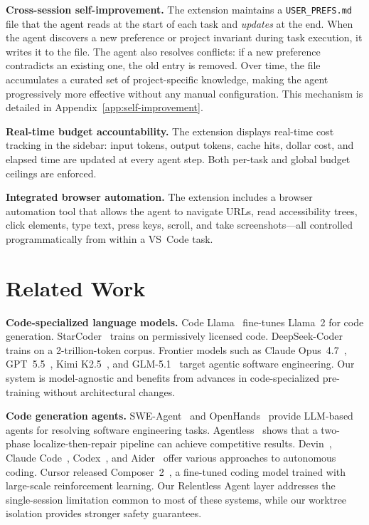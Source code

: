 \documentclass{article}
\begin{document}
\textbf{Cross-session self-improvement.}  The extension maintains a \texttt{USER\_PREFS.md} file that the agent reads at the start of each task and \emph{updates} at the end.  When the agent discovers a new preference or project invariant during task execution, it writes it to the file.  The agent also resolves conflicts: if a new preference contradicts an existing one, the old entry is removed.  Over time, the file accumulates a curated set of project-specific knowledge, making the agent progressively more effective without any manual configuration.  This mechanism is detailed in Appendix~\ref{app:self-improvement}.

\textbf{Real-time budget accountability.}  The extension displays real-time cost tracking in the sidebar: input tokens, output tokens, cache hits, dollar cost, and elapsed time are updated at every agent step.  Both per-task and global budget ceilings are enforced.

\textbf{Integrated browser automation.}  The extension includes a browser automation tool that allows the agent to navigate URLs, read accessibility trees, click elements, type text, press keys, scroll, and take screenshots---all controlled programmatically from within a VS~Code task.

\section{Related Work}
\label{sec:related}

\textbf{Code-specialized language models.}  Code Llama~\citep{roziere2023code} fine-tunes Llama~2 for code generation.  StarCoder~\citep{li2023starcoder} trains on permissively licensed code.  DeepSeek-Coder~\citep{guo2024deepseek} trains on a 2-trillion-token corpus.  Frontier models such as Claude Opus~4.7~\citep{anthropic2026opus47}, GPT~5.5~\citep{openai2026gpt55}, Kimi K2.5~\citep{kimiteam2026k25}, and GLM-5.1~\citep{zai2026glm51} target agentic software engineering.  Our system is model-agnostic and benefits from advances in code-specialized pre-training without architectural changes.

\textbf{Code generation agents.}  SWE-Agent~\citep{yang2024sweagent} and OpenHands~\citep{wang2024openhands} provide LLM-based agents for resolving software engineering tasks.  Agentless~\citep{xia2024agentless} shows that a two-phase localize-then-repair pipeline can achieve competitive results.  Devin~\citep{devin2024}, Claude Code~\citep{claudecode2025}, Codex~\citep{codex2025}, and Aider~\citep{aider2023} offer various approaches to autonomous coding.  Cursor released Composer~2~\citep{cursor2026composer2}, a fine-tuned coding model trained with large-scale reinforcement learning.  Our Relentless Agent layer addresses the single-session limitation common to most of these systems, while our worktree isolation provides stronger safety guarantees.
\end{document}

